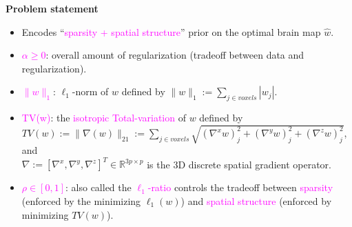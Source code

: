 \documentclass[french]{STIC_poster}
\begin{document}
\begin{frame}[t]
\begin{columns}[t]
\begin{column}{.48\linewidth}
\begin{sxbox}[\textwidth]{\textbf{Problem statement}}
\begin{itemize}
\begin{itemize}
                                      \item Encodes ``\textcolor{magenta}{sparsity + spatial structure}'' prior on the optimal brain map $\hat{w}$.
                                      \item \textcolor{magenta}{$\alpha \ge 0$}: overall amount of regularization (tradeoff between data and regularization).
                                        \item \textcolor{magenta}{$\|w\|_1$}: $\ell_1$-norm of $w$ defined by $\|w\|_1 := \sum_{j \in voxels}{|w_j|}$.
                                      \item \textcolor{magenta}{TV(w)}: the \textcolor{magenta}{isotropic Total-variation} of $w$ defined by\\
                                        $TV(w):=\|\nabla(w)\|_{21} :=\sum_{j \in voxels}{\sqrt{(\nabla^xw)_j^2+(\nabla^yw)_j^2+(\nabla^zw)_j^2}}$,
                                        and \\ $\nabla := [\nabla^x,\nabla^y,\nabla^z]^T \in \mathbb{R}^{3p \times p}$
                                        is the 3D discrete spatial gradient operator.
                                      \item \textcolor{magenta}{$\rho \in [0, 1]$}: also called the \textcolor{magenta}{$\ell_1$-ratio} controls the tradeoff between \textcolor{magenta}{sparsity}
                                        (enforced by the minimizing $\ell_1(w)$) and
                                        \textcolor{magenta}{spatial structure} (enforced by minimizing $TV(w)$).


\end{itemize}
\end{itemize}
\end{sxbox}
\end{column}
\end{columns}
\end{frame}
\end{document}
